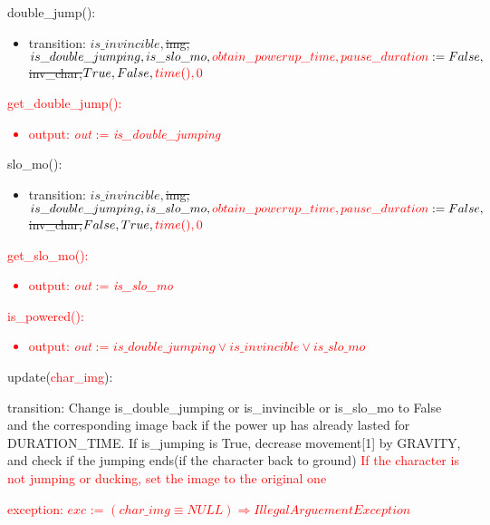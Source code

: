 \documentclass[12pt]{article}
\begin{document}
\noindent double\_jump():
\begin{itemize}
\item transition: $is\_invincible, $\sout{img,}$ is\_double\_jumping, is\_slo\_mo, \textcolor{red}{obtain\_powerup\_time, pause\_duration}\\ := False, $\sout{inv\_char,}$ True, False, \textcolor{red}{time(), 0}$\\
\end{itemize}

\noindent \textcolor{red}{get\_double\_jump():
\begin{itemize}
\item output: \textit{out} := \textit{is\_double\_jumping}
\end{itemize}}

\noindent slo\_mo():
\begin{itemize}
\item transition: $is\_invincible, $\sout{img,}$ is\_double\_jumping, is\_slo\_mo, \textcolor{red}{obtain\_powerup\_time, pause\_duration}\\ := False, $\sout{inv\_char,}$ False, True, \textcolor{red}{time(), 0}$\\
\end{itemize}

\noindent \textcolor{red}{get\_slo\_mo():
\begin{itemize}
\item output: \textit{out} := \textit{is\_slo\_mo}
\end{itemize}}

\noindent \textcolor{red}{is\_powered():
\begin{itemize}
\item output: \textit{out} := \textit{$is\_double\_jumping \lor is\_invincible \lor is\_slo\_mo$}
\end{itemize}}

\noindent update(\textcolor{red}{char\_img}):
\begin{itemize}
\item transition: Change is\_double\_jumping or is\_invincible or is\_slo\_mo to False and the corresponding image back if the power up has already lasted for DURATION\_TIME. If is\_jumping is True, decrease movement[1] by GRAVITY, and check if the jumping ends(if the character back to ground) \textcolor{red}{If the character is not jumping or ducking, set the image to the original one}
\textcolor{red}{\item exception: $exc$ := $(char\_img \equiv NULL) \Rightarrow IllegalArguementException$}
\end{itemize}
\end{document}
